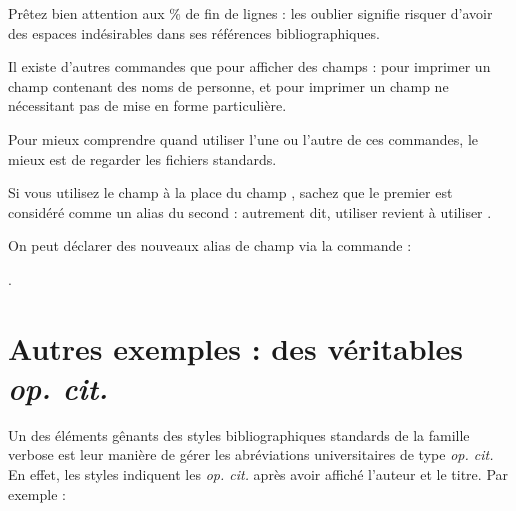 \begin{latexcode}
\end{latexcode}





Prêtez bien attention aux \% de fin de lignes : les oublier signifie risquer d'avoir des espaces indésirables dans ses références bibliographiques.


\begin{plusloins}

Il  existe d'autres commandes que  pour afficher des champs :  pour imprimer un champ contenant des noms de personne, et  pour imprimer un champ ne nécessitant pas de mise en forme particulière.

Pour mieux comprendre quand utiliser l'une ou l'autre de ces commandes, le mieux est de regarder les fichiers standards.

\end{plusloins}
\begin{plusloins}
Si vous utilisez le champ  à la place du champ , sachez que le premier est considéré comme un alias du second : autrement dit, utiliser  revient à utiliser .

On peut déclarer des nouveaux alias de champ via la commande :

 .
\end{plusloins}

\section{Autres exemples : des véritables \emph{op. cit.}}

Un des éléments gênants des styles bibliographiques standards de la famille verbose est leur manière de gérer les abréviations universitaires de type \emph{op. cit.} En effet, les styles indiquent les \emph{op. cit.} après avoir affiché l'auteur et le titre. Par exemple :

\begin{quotation}
\bibverbose	
\cite{Urner1952}

\cite{Saxer1980}
\bibverbosetrad

\cite{Urner1952}

\cite{Saxer1980}
\end{quotation}

